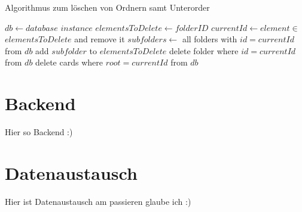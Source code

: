 \begin{algorithm}
	\caption{Algorithmus zum löschen von Ordnern samt Unterorder} 
	\begin{algorithmic}[1]
	    \State $db \leftarrow database$ $instance$
	    \State $elementsToDelete \leftarrow folderID$
		    \State $currentId\leftarrow element \in$ $elementsToDelete$ and remove it
		    \State $subfolders\leftarrow$ all folders with $id=currentId$ from $db$
		        \State add $subfolder$ to $elementsToDelete$
		    \EndFor
		    \State delete folder where $id=currentId$ from $db$
		    \State delete cards where $root=currentId$ from $db$
		\EndWhile
	\end{algorithmic} 
\end{algorithm}

\section{Backend}
\label{section:backend}
Hier so Backend :)

\section{Datenaustausch}
\label{section:datenaustausch}
Hier ist Datenaustausch am passieren glaube ich :)
